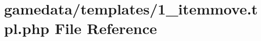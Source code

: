\hypertarget{1__itemmove_8tpl_8php}{\section{gamedata/templates/1\+\_\+itemmove.tpl.\+php File Reference}
\label{1__itemmove_8tpl_8php}
}
